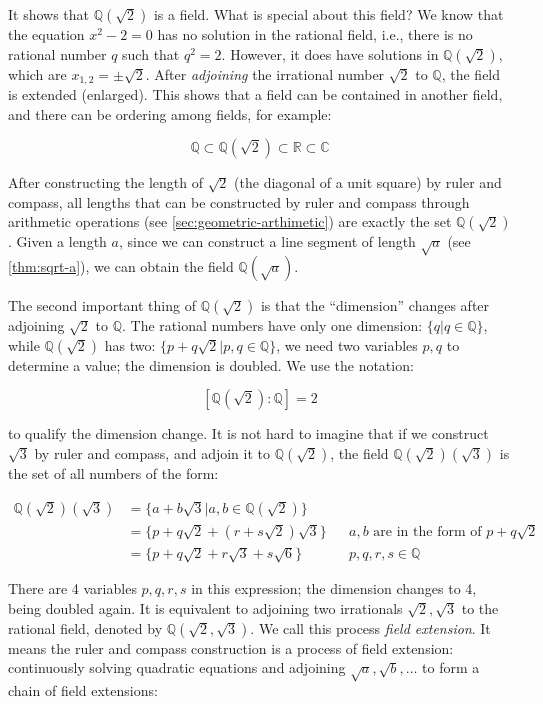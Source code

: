 It shows that $\mathbb{Q}(\sqrt{2})$ is a field. What is special about this field? We know that the equation $x^2 - 2 = 0$ has no solution in the rational field, i.e., there is no rational number $q$ such that $q^2 = 2$. However, it does have solutions in $\mathbb{Q}(\sqrt{2})$, which are $x_{1, 2} = \pm \sqrt{2}$. After \emph{adjoining} the irrational number $\sqrt{2}$ to $\mathbb{Q}$, the field is extended (enlarged). This shows that a field can be contained in another field, and there can be ordering among fields, for example:

\[
\mathbb{Q} \subset \mathbb{Q}(\sqrt{2}) \subset \mathbb{R} \subset \mathbb{C}
\]

After constructing the length of $\sqrt{2}$ (the diagonal of a unit square) by ruler and compass, all lengths that can be constructed by ruler and compass through arithmetic operations (see \cref{sec:geometric-arthimetic}) are exactly the set $\mathbb{Q}(\sqrt{2})$. Given a length $a$, since we can construct a line segment of length $\sqrt{a}$ (see \cref{thm:sqrt-a}), we can obtain the field $\mathbb{Q}(\sqrt{a})$.

The second important thing of $\mathbb{Q}(\sqrt{2})$ is that the \enquote{dimension} changes after adjoining $\sqrt{2}$ to $\mathbb{Q}$. The rational numbers have only one dimension: $\{q | q \in \mathbb{Q}\}$, while $\mathbb{Q}(\sqrt{2})$ has two: $\{p + q \sqrt{2} | p, q \in \mathbb{Q}\}$, we need two variables $p, q$ to determine a value; the dimension is doubled. We use the notation:

\[
[\mathbb{Q}(\sqrt{2}) : \mathbb{Q}] = 2
\]

to qualify the dimension change. It is not hard to imagine that if we construct $\sqrt{3}$ by ruler and compass, and adjoin it to $\mathbb{Q}(\sqrt{2})$, the field $\mathbb{Q}(\sqrt{2})(\sqrt{3})$ is the set of all numbers of the form:

\begin{align*}
  \mathbb{Q}(\sqrt{2})(\sqrt{3}) &= \{a + b \sqrt{3} | a, b \in \mathbb{Q}(\sqrt{2}) \} \\
  &= \{p + q \sqrt{2} + (r + s\sqrt{2})\sqrt{3} \} && a, b \text{ are in the form of } p + q\sqrt{2} \\
  &= \{p + q \sqrt{2} + r\sqrt{3} + s\sqrt{6} \} && p, q, r, s \in \mathbb{Q}
\end{align*}

There are 4 variables $p, q, r, s$ in this expression; the dimension changes to 4, being doubled again. It is equivalent to adjoining two irrationals $\sqrt{2}, \sqrt{3}$ to the rational field, denoted by $\mathbb{Q}(\sqrt{2}, \sqrt{3})$. We call this process \emph{field extension}. It means the ruler and compass construction is a process of field extension: continuously solving quadratic equations and adjoining $\sqrt{a}, \sqrt{b}, \dotsc$ to form a chain of field extensions:

